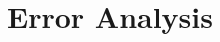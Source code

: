 \documentclass{article}
\begin{document}
\begin{enumerate}
\begin{itemize}
	\end{itemize}
\end{enumerate}
\section{Error Analysis}
\end{document}
